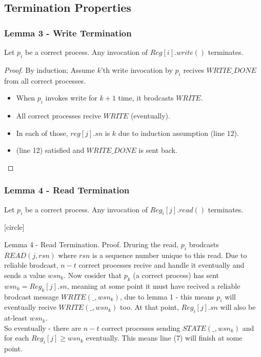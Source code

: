 \subsection{Termination Properties}
\begin{frame}
    \frametitle{Lemma 3 - Write Termination}
    \begin{lemma}
        Let $p_i$ be a correct process.
        Any invocation of $Reg[i].write()$ terminates.
    \end{lemma}
    \begin{proof}
        By induction; Assume $k$'th write invocation by $p_i$ recives $WRTIE\_DONE$ from all correct processes.
        \begin{itemize}
            \item When $p_i$ invokes write for $k+1$ time, it brodcasts $WRITE$.
            \item All correct processes recive $WRITE$ (eventually).
            \item In each of those, $reg[j].sn$ is $k$ due to induction assumption (line 12).
            \item (line 12) satisfied and $WRITE\_DONE$ is sent back.
        \end{itemize}
    \end{proof}
\end{frame}
\begin{frame}
    \frametitle{Lemma 4 - Read Termination}
    \begin{lemma}
        Let $p_i$ be a correct process. Any invocation of $Reg_i[j].read()$ terminates.
    \end{lemma}
\end{frame}
[circle]
\begin{frame}{Lemma 4 - Read Termination. Proof.}
    Druring the read, $p_i$ brodcasts $READ(j,rsn)$ where $rsn$ is a sequence number 
    unique to this read. Due to reliable brodcast, $n-t$ correct processes recive and handle
    it eventually and sends a value $wsn_k$. Now cosider that $p_k$ (a correct process)
    has sent $wsn_k=Reg_k[j].sn$, meaning at some point it must have recived a
    reliable brodcast message $WRITE(\_,wsn_k)$, due to lemma 1 - this means $p_i$ will
    eventually recive $WRITE(\_,wsn_k)$ too. At that point, $Reg_i[j].sn$ will also
    be at-least $wsn_k$.\\
    So eventually - there are $n-t$ correct processes sending $STATE(\_, wsn_k)$
    and for each $Reg_i[j]\geq wsn_k$ eventually. This means line (7) will finish at some point.\\
\end{frame}
